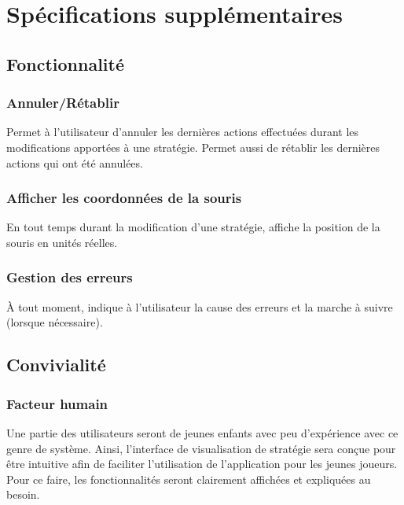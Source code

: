 \chapter{Spécifications supplémentaires}
\label{s:supplementary_specification}
\section{Fonctionnalité}

\subsection{Annuler/Rétablir}
Permet à l'utilisateur d'annuler les dernières actions effectuées durant les modifications apportées à une stratégie. Permet aussi de rétablir les dernières actions qui ont été annulées.

\subsection{Afficher les coordonnées de la souris}
En tout temps durant la modification d'une stratégie, affiche la position de la souris en unités réelles.

\subsection{Gestion des erreurs}
À tout moment, indique à l'utilisateur la cause des erreurs et la marche à suivre (lorsque nécessaire).

\section{Convivialité}

\subsection{Facteur humain}
Une partie des utilisateurs seront de jeunes enfants avec peu d'expérience avec ce genre de système. Ainsi, l'interface de visualisation de stratégie sera conçue pour être intuitive afin de faciliter l'utilisation de l'application pour les jeunes joueurs. Pour ce faire, les fonctionnalités seront clairement affichées et expliquées au besoin.